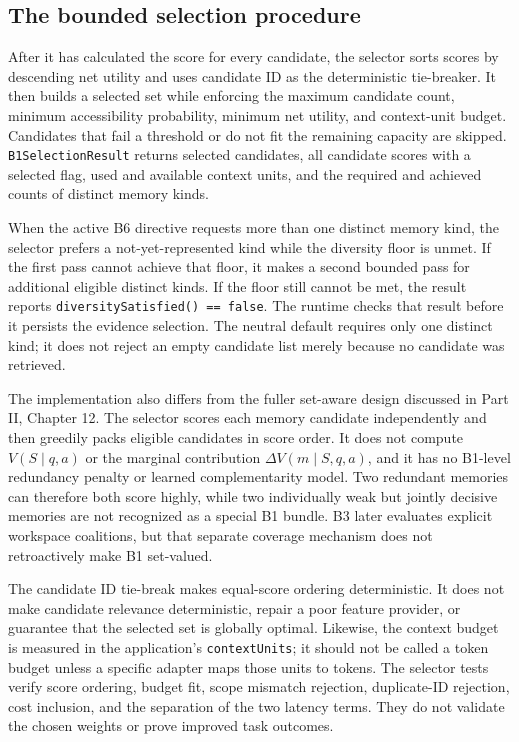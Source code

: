 \subsection{The bounded selection procedure}
\label{subsec:ch21-b1-bounds}

After it has calculated the score for every candidate, the selector sorts scores by descending net utility and uses candidate ID as the deterministic tie-breaker. It then builds a selected set while enforcing the maximum candidate count, minimum accessibility probability, minimum net utility, and context-unit budget. Candidates that fail a threshold or do not fit the remaining capacity are skipped. \texttt{B1SelectionResult} returns selected candidates, all candidate scores with a selected flag, used and available context units, and the required and achieved counts of distinct memory kinds.

When the active B6 directive requests more than one distinct memory kind, the selector prefers a not-yet-represented kind while the diversity floor is unmet. If the first pass cannot achieve that floor, it makes a second bounded pass for additional eligible distinct kinds. If the floor still cannot be met, the result reports \texttt{diversitySatisfied() == false}. The runtime checks that result before it persists the evidence selection. The neutral default requires only one distinct kind; it does not reject an empty candidate list merely because no candidate was retrieved.

The implementation also differs from the fuller set-aware design discussed in Part II, Chapter 12. The selector scores each memory candidate independently and then greedily packs eligible candidates in score order. It does not compute \(V(S\mid q,a)\) or the marginal contribution \(\Delta V(m\mid S,q,a)\), and it has no B1-level redundancy penalty or learned complementarity model. Two redundant memories can therefore both score highly, while two individually weak but jointly decisive memories are not recognized as a special B1 bundle. B3 later evaluates explicit workspace coalitions, but that separate coverage mechanism does not retroactively make B1 set-valued.

The candidate ID tie-break makes equal-score ordering deterministic. It does not make candidate relevance deterministic, repair a poor feature provider, or guarantee that the selected set is globally optimal. Likewise, the context budget is measured in the application's \texttt{contextUnits}; it should not be called a token budget unless a specific adapter maps those units to tokens. The selector tests verify score ordering, budget fit, scope mismatch rejection, duplicate-ID rejection, cost inclusion, and the separation of the two latency terms. They do not validate the chosen weights or prove improved task outcomes.

